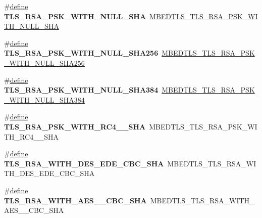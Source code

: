 \begin{DoxyCompactItemize}
\item 
\mbox{\label{compat-1_83_8h_a97af406e8dfe646bdd6f3a8c080c2ac6}} 
\#\hyperlink{structdefine}{define} {\bfseries T\+L\+S\+\_\+\+R\+S\+A\+\_\+\+P\+S\+K\+\_\+\+W\+I\+T\+H\+\_\+\+N\+U\+L\+L\+\_\+\+S\+HA}~\hyperlink{ssl__ciphersuites_8h_a4d89c083d437714fafa9bafb82657026}{M\+B\+E\+D\+T\+L\+S\+\_\+\+T\+L\+S\+\_\+\+R\+S\+A\+\_\+\+P\+S\+K\+\_\+\+W\+I\+T\+H\+\_\+\+N\+U\+L\+L\+\_\+\+S\+HA}
\item 
\mbox{\label{compat-1_83_8h_aadc35f48cf20e44b272cff7a20dfe415}} 
\#\hyperlink{structdefine}{define} {\bfseries T\+L\+S\+\_\+\+R\+S\+A\+\_\+\+P\+S\+K\+\_\+\+W\+I\+T\+H\+\_\+\+N\+U\+L\+L\+\_\+\+S\+H\+A256}~\hyperlink{ssl__ciphersuites_8h_a36173bf1e36189d2def863d0a32610b3}{M\+B\+E\+D\+T\+L\+S\+\_\+\+T\+L\+S\+\_\+\+R\+S\+A\+\_\+\+P\+S\+K\+\_\+\+W\+I\+T\+H\+\_\+\+N\+U\+L\+L\+\_\+\+S\+H\+A256}
\item 
\mbox{\label{compat-1_83_8h_a700ed898e7a9250651a61a6ffc5743c0}} 
\#\hyperlink{structdefine}{define} {\bfseries T\+L\+S\+\_\+\+R\+S\+A\+\_\+\+P\+S\+K\+\_\+\+W\+I\+T\+H\+\_\+\+N\+U\+L\+L\+\_\+\+S\+H\+A384}~\hyperlink{ssl__ciphersuites_8h_a2e8b7ed448562687cd07add0b3acdb6f}{M\+B\+E\+D\+T\+L\+S\+\_\+\+T\+L\+S\+\_\+\+R\+S\+A\+\_\+\+P\+S\+K\+\_\+\+W\+I\+T\+H\+\_\+\+N\+U\+L\+L\+\_\+\+S\+H\+A384}
\item 
\mbox{\label{compat-1_83_8h_a3aa6159150ee5dff96e861b87defdeb6}} 
\#\hyperlink{structdefine}{define} {\bfseries T\+L\+S\+\_\+\+R\+S\+A\+\_\+\+P\+S\+K\+\_\+\+W\+I\+T\+H\+\_\+\+R\+C4\+\_\+\_\+\+S\+HA}~M\+B\+E\+D\+T\+L\+S\+\_\+\+T\+L\+S\+\_\+\+R\+S\+A\+\_\+\+P\+S\+K\+\_\+\+W\+I\+T\+H\+\_\+\+R\+C4\+\_\+\_\+\+S\+HA
\item 
\mbox{\label{compat-1_83_8h_ae93cd5c8ebf49d2d1586e7d5f180cd78}} 
\#\hyperlink{structdefine}{define} {\bfseries T\+L\+S\+\_\+\+R\+S\+A\+\_\+\+W\+I\+T\+H\+\_\+D\+E\+S\+\_\+\+E\+D\+E\+\_\+\+C\+B\+C\+\_\+\+S\+HA}~M\+B\+E\+D\+T\+L\+S\+\_\+\+T\+L\+S\+\_\+\+R\+S\+A\+\_\+\+W\+I\+T\+H\+\_\+D\+E\+S\+\_\+\+E\+D\+E\+\_\+\+C\+B\+C\+\_\+\+S\+HA
\item 
\mbox{\label{compat-1_83_8h_a160e2286953c5ca7c436f2c9df205313}} 
\#\hyperlink{structdefine}{define} {\bfseries T\+L\+S\+\_\+\+R\+S\+A\+\_\+\+W\+I\+T\+H\+\_\+\+A\+E\+S\+\_\+\_\+\+C\+B\+C\+\_\+\+S\+HA}~M\+B\+E\+D\+T\+L\+S\+\_\+\+T\+L\+S\+\_\+\+R\+S\+A\+\_\+\+W\+I\+T\+H\+\_\+\+A\+E\+S\+\_\+\_\+\+C\+B\+C\+\_\+\+S\+HA

\end{DoxyCompactItemize}

